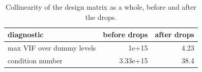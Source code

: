 \begin{table}[htbp]
\centering
\caption{Collinearity of the design matrix as a whole, before and after the drops.}\label{tab:cond}
\begin{tabular}{lrr}
\toprule
diagnostic & before drops & after drops \\
\midrule
max VIF over dummy levels & 1e+15 & 4.23 \\
condition number & 3.33e+15 & 38.4 \\
\bottomrule
\end{tabular}
\end{table}
